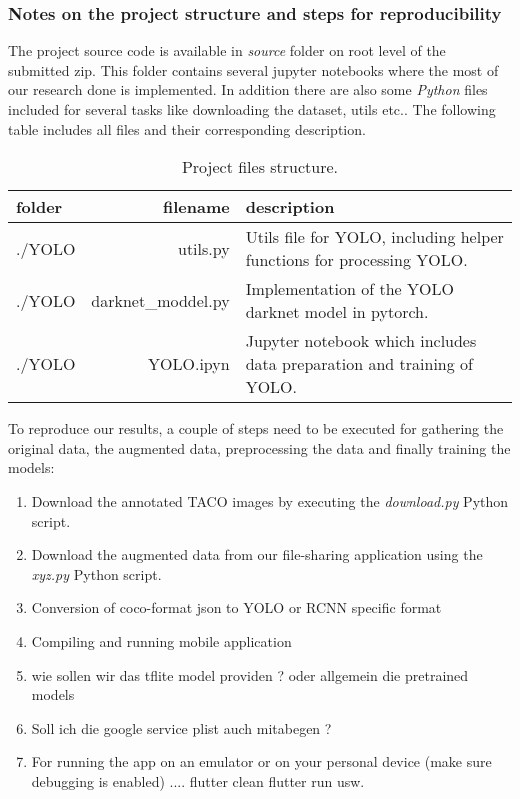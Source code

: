 	\subsubsection{Notes on the project structure and steps for reproducibility}
	
	The project source code is available in \textit{source} folder on root level of the submitted zip. This folder contains several jupyter notebooks where the most of our research done is implemented. In addition there are also some \textit{Python} files included for several tasks like downloading the dataset, utils etc.. The following table includes all files and their corresponding description.
	
	\begin{table*}[h!]
		\centering
		\begin{tabular}{lrl}
			\hline folder & filename & description \\ \hline
			./YOLO &  utils.py   &  Utils file for YOLO, including helper functions for processing YOLO. \\
			./YOLO & darknet\_moddel.py & Implementation of the YOLO darknet model in pytorch. \\
			./YOLO &  YOLO.ipyn & Jupyter notebook which includes data preparation and training of YOLO. \\
			 \hline
		\end{tabular}
		\caption{Project files structure.}
		\label{tab0}
	\end{table*}
	
	To reproduce our results, a couple of steps need to be executed for gathering the original data, the augmented data, preprocessing the data and finally training the models:
	\begin{enumerate}
		\item Download the annotated TACO images by executing the \textit{download.py} Python script.
		\item Download the augmented data from our file-sharing application using the \textit{xyz.py} Python script.
		\item Conversion of coco-format json to YOLO or RCNN specific format
		\item Compiling and running mobile application 
		\item wie sollen wir das tflite model providen ? oder allgemein die pretrained models 
		\item Soll ich die google service plist auch mitabegen ?
		\item For running the app on an emulator or on your personal device (make sure debugging is enabled) .... flutter clean flutter run usw.
	\end{enumerate}